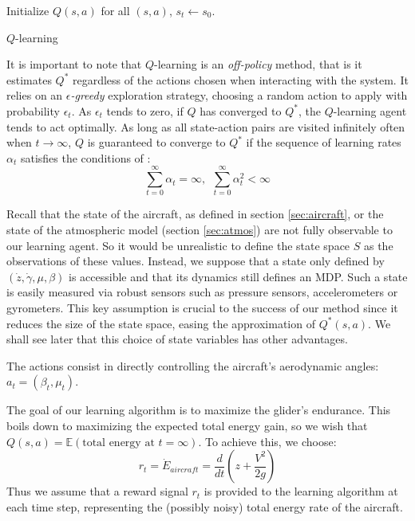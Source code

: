 \documentclass{ifacconf}
\begin{document}
\begin{algorithm2e}
\DontPrintSemicolon
Initialize $Q(s,a)$ for all $(s,a)$,\;{}
$s_{t} \leftarrow s_{0}$.\;
\caption{$Q$-learning}
\label{alg:q-learning}
\end{algorithm2e}

It is important to note that $Q$-learning is an \emph{off-policy} method, that is it estimates $Q^*$ regardless of the actions chosen when interacting with the system. It relies on an \emph{$\epsilon$-greedy} exploration strategy, choosing a random action to apply with probability $\epsilon_t$. As $\epsilon_t$ tends to zero, if $Q$ has converged to $Q^*$, the $Q$-learning agent tends to act optimally. As long as all state-action pairs are visited infinitely often when $t\rightarrow\infty$, $Q$ is guaranteed to converge to $Q^*$ if the sequence of learning rates $\alpha_t$ satisfies the conditions of \cite{robbins1951}: 
\begin{equation*}
\sum_{t=0}^\infty \alpha_t = \infty, \ \
\sum_{t=0}^\infty \alpha_t^2 < \infty
\end{equation*}

Recall that the state of the aircraft, as defined in section \ref{sec:aircraft}, or the state of the atmospheric model (section \ref{sec:atmos}) are not fully observable to our learning agent. So it would be unrealistic to define the state space $S$ as the observations of these values. Instead, we suppose that a state only defined by $(\dot{z}, \dot{\gamma}, \mu, \beta)$ is accessible and that its dynamics still defines an MDP. Such a state is easily measured via robust sensors such as pressure sensors, accelerometers or gyrometers. This key assumption is crucial to the success of our method since it reduces the size of the state space, easing the approximation of $Q^*(s,a)$. We shall see later that this choice of state variables has other advantages.

The actions consist in directly controlling the aircraft's aerodynamic angles: $a_t=(\beta_t,\mu_t)$.

The goal of our learning algorithm is to maximize the glider's endurance. This boils down to maximizing the expected total energy gain, so we wish that $Q(s,a)=\mathbb{E}\left(\textrm{total energy at }t=\infty\right)$. To achieve this, we choose:
\begin{equation}
r_{t} = \dot{E}_{aircraft} = \frac{d}{dt} \left( z + \frac{V^2}{2g}\right)
\end{equation}
Thus we assume that a reward signal $r_t$ is provided to the learning algorithm at each time step, representing the (possibly noisy) total energy rate of the aircraft.
\end{document}
